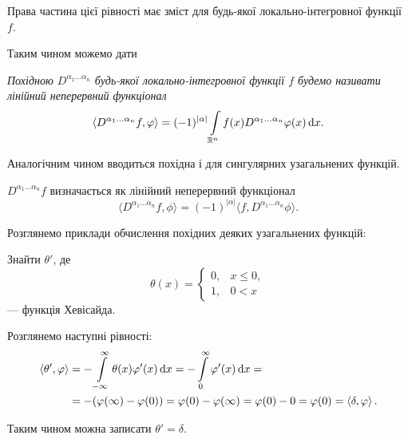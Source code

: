 Права частина цієї рівності має зміст для будь-якої локально-інтегровної функції $f$. \medskip \allowbreak

Таким чином можемо дати
\begin{definition}
	\it{Похідною} $D^{\alpha_1 \ldots \alpha_n}$ будь-якої локально-інтегровної функції $f$ будемо називати лінійний неперервний функціонал
	\begin{equation}
		\langle D^{\alpha_1 \ldots \alpha_n} f, \phi \rangle = (-1)^{|\alpha|} \Int_{\RR^n} f(x) D^{\alpha_1 \ldots \alpha_n} \phi(x) \diff x.	
	\end{equation}
\end{definition}

Аналогічним чином вводиться похідна і для сингулярних узагальнених функцій.
\begin{definition}
	$D^{\alpha_1 \ldots \alpha_n} f$ визначається як лінійний неперервний функціонал
	\begin{equation}
		\langle D^{\alpha_1 \ldots \alpha_n} f, \phi \rangle = (-1)^{|\alpha|} \langle f, D^{\alpha_1 \ldots \alpha_n} \phi \rangle.
	\end{equation}
\end{definition}

Розглянемо приклади обчислення похідних деяких узагальнених функцій:
\begin{example}
	Знайти $\theta'$, де 
	\begin{equation}
		\theta(x) = \begin{cases}
			0, & x \le 0, \\
			1, & 0 < x
		\end{cases}	
	\end{equation}
	--- функція Хевісайда.
\end{example}

\begin{solution}
	Розглянемо наступні рівності:
	\begin{equation}
		\begin{aligned}
			\langle \theta', \phi \rangle &= - \Int_{-\infty}^\infty \theta(x) \phi'(x) \diff x = - \Int_{0}^\infty \phi'(x) \diff x = \\
			&= - (\phi(\infty) - \phi(0)) = \phi(0) - \phi(\infty) = \phi(0) - 0 = \phi(0) = \langle \delta, \phi \rangle.	
		\end{aligned}
	\end{equation}

	Таким чином можна записати $\theta' = \delta$.
\end{solution}

